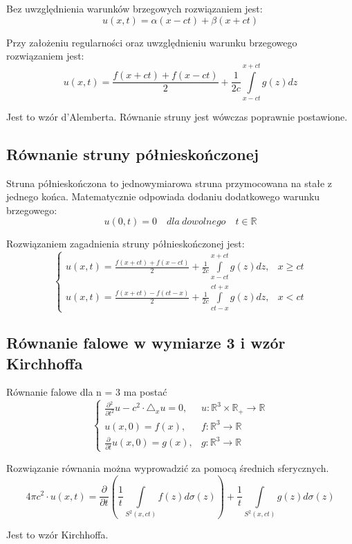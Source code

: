 \documentclass{article}
\begin{document}
Bez uwzględnienia warunków brzegowych rozwiązaniem jest: 
$$ u(x,t)=\alpha (x-ct)+\beta (x+ct) $$

Przy założeniu regularności oraz uwzględnieniu warunku brzegowego rozwiązaniem jest: 
\[ u(x,t)={\frac {f(x+ct)+f(x-ct)}{2}}+{\frac {1}{2c}}\int \limits _{x-ct}^{x+ct}{g(z)dz} \]

Jest to wzór d’Alemberta. Równanie struny jest wówczas poprawnie postawione. 

\subsection*{Równanie struny półnieskończonej}
Struna półnieskończona to jednowymiarowa struna przymocowana na stałe z jednego końca. Matematycznie odpowiada dodaniu dodatkowego warunku brzegowego: 
$$ u(0,t)=0 \quad dla \: dowolnego \quad t\in \mathbb {R} $$

Rozwiązaniem zagadnienia struny półnieskończonej jest: 
\begin{equation*}
{\begin{cases}u(x,t)={\frac {f(x+ct)+f(x-ct)}{2}}+{\frac {1}{2c}}\int \limits _{x-ct}^{x+ct}{g(z)dz},&x\geq {}ct\\[2pt]u(x,t)={\frac {f(x+ct)-f(ct-x)}{2}}+{\frac {1}{2c}}\int \limits _{ct-x}^{ct+x}{g(z)dz},&x<ct\end{cases}}
\end{equation*}

\subsection*{Równanie falowe w wymiarze 3 i wzór Kirchhoffa}
Równanie falowe dla n = 3 ma postać
\[ {\begin{cases}{\frac {\partial {}^{2}}{\partial t^{2}}}u-c^{2}\cdot \triangle _{x}u=0,&u:\mathbb {R} ^{3}\times \mathbb {R} _{+}\to {}\mathbb {R} \\u(x,0)=f(x),&f:\mathbb {R} ^{3}\to \mathbb {R} \\[2pt]{\frac {\partial {}}{\partial t}}u(x,0)=g(x),&g:\mathbb {R} ^{3}\to \mathbb {R} \end{cases}} \]

Rozwiązanie równania można wyprowadzić za pomocą średnich sferycznych. 
$$ 4\pi {}c^{2}{}\cdot {}u(x,t)={\frac {\partial }{\partial t}}\left({\frac {1}{t}}\int \limits _{S^{2}(x,ct)}{f(z)d\sigma (z)}\right)+{\frac {1}{t}}\int \limits _{S^{2}(x,ct)}{g(z)d\sigma (z)} $$

Jest to wzór Kirchhoffa. 
\end{document}
